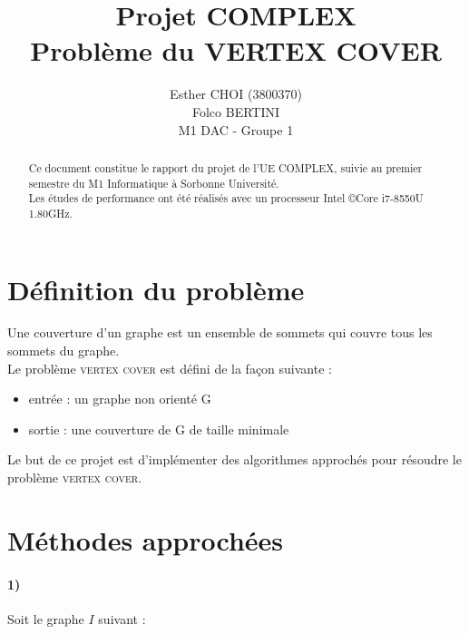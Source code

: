 \documentclass[12pt]{article}
\title{Projet COMPLEX\\Problème du VERTEX COVER}
\author{Esther CHOI (3800370)\\Folco BERTINI\\M1 DAC - Groupe 1}
\begin{document}
\maketitle
\tableofcontents

\begin{abstract}
    Ce document constitue le rapport du projet de l'UE COMPLEX, suivie au premier semestre du M1 Informatique à Sorbonne Université. \\
    Les études de performance ont été réalisés avec un processeur Intel \copyright Core \texttrademark i7-8550U 1.80GHz. \\
\end{abstract}

\newpage

\section{Définition du problème}

    Une couverture d'un graphe est un ensemble de sommets qui couvre tous les sommets du graphe. \\
    Le problème \textsc{vertex cover} est défini de la façon suivante :

    \begin{itemize}
        \item entrée : un graphe non orienté G
        \item sortie : une couverture de G de taille minimale
    \end{itemize}

    Le but de ce projet est d'implémenter des algorithmes approchés pour résoudre le problème \textsc{vertex cover}.

\section{Méthodes approchées}

    \paragraph{1)}
        Soit le graphe $I$ suivant :
\end{document}

